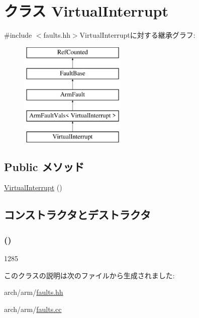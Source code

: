 \hypertarget{classArmISA_1_1VirtualInterrupt}{
\section{クラス VirtualInterrupt}
\label{classArmISA_1_1VirtualInterrupt}
}


{\ttfamily \#include $<$faults.hh$>$}VirtualInterruptに対する継承グラフ:\begin{figure}[H]
\begin{center}
\leavevmode
\includegraphics[height=5cm]{classArmISA_1_1VirtualInterrupt}
\end{center}
\end{figure}
\subsection*{Public メソッド}
\begin{DoxyCompactItemize}
\item 
\hyperlink{classArmISA_1_1VirtualInterrupt_ad1659bb054ed9b76cdb1d897198af0ca}{VirtualInterrupt} ()
\end{DoxyCompactItemize}


\subsection{コンストラクタとデストラクタ}
\hypertarget{classArmISA_1_1VirtualInterrupt_ad1659bb054ed9b76cdb1d897198af0ca}{
\subsubsection[{VirtualInterrupt}]{ ()}}
\label{classArmISA_1_1VirtualInterrupt_ad1659bb054ed9b76cdb1d897198af0ca}



\begin{DoxyCode}
1285 {}
\end{DoxyCode}


このクラスの説明は次のファイルから生成されました:\begin{DoxyCompactItemize}
\item 
arch/arm/\hyperlink{arch_2arm_2faults_8hh}{faults.hh}\item 
arch/arm/\hyperlink{arch_2arm_2faults_8cc}{faults.cc}\end{DoxyCompactItemize}
